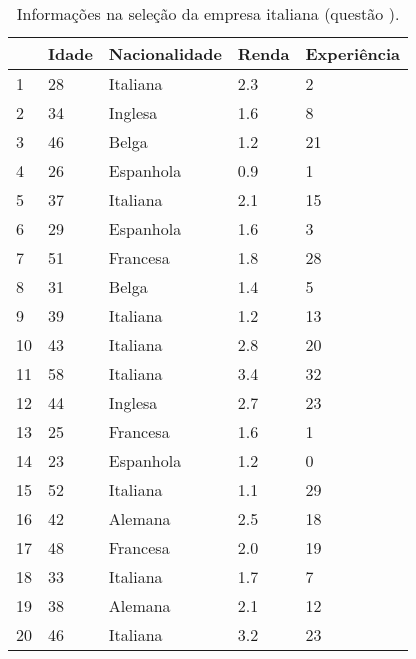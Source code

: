 \documentclass[a4paper,11pt]{article}
\begin{document}
\begin{table}[h] \centering
\begin{tabular}{ l | l l l l}
  	& Idade 	& Nacionalidade & Renda & Experiência\\ \hline \hline
1	&  28 	& Italiana 		&  2.3 	& 2 \\
2	&  34 	& Inglesa 		& 1.6 	& 8 \\
3	&  46   	& Belga 		& 1.2 	& 21 \\
4	&  26		& Espanhola 	& 0.9 	&1 \\
5	&  37 	& Italiana		& 2.1 	& 15 \\
6 	&  29 	& Espanhola	& 1.6 	& 3 \\
7 	&  51 	& Francesa 	& 1.8 	& 28 \\
8 	&  31 	& Belga 		& 1.4 	& 5 \\
9 	&  39 	& Italiana 		&  1.2 	&13 \\
10 	&  43 	& Italiana		& 2.8 	& 20 \\
11 	&  58 	& Italiana		& 3.4 	& 32 \\
12 	&  44 	& Inglesa		& 2.7 	& 23 \\
13 	&  25 	& Francesa 	& 1.6 	& 1 \\
14 	&  23 	& Espanhola	& 1.2 	& 0 \\
15 	&  52 	& Italiana		& 1.1 	& 29 \\
16 	&  42 	& Alemana	&  2.5 	&18 \\
17 	&  48 	& Francesa 	& 2.0 	& 19 \\
18 	&  33 	& Italiana		& 1.7 	& 7 \\
19 	&  38 	& Alemana	& 2.1 	& 12 \\
20 	&  46 	& Italiana		& 3.2 	& 23 \\
\end{tabular} 
\caption{Informações na seleção da empresa italiana (questão \protect{\ref{sec:q2}}).}
\label{tab:ex2}
\end{table}
\end{document}
